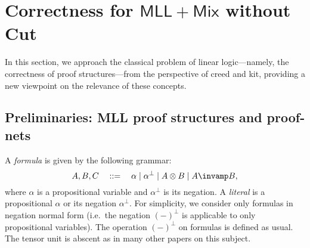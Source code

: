 \section{Correctness for $\mathsf{MLL+Mix}$ without Cut}
In this section, we approach the classical problem of linear logic---namely, the correctness of proof structures---from the perspective of creed and kit, providing a new viewpoint on the relevance of these concepts.


\subsection{Preliminaries: MLL proof structures and proof-nets}

\newcommand{\PropVar}{\alpha}
\newcommand{\PropVarb}{\beta}
\newcommand{\PropVarc}{\gamma}

A \emph{formula} is given by the following grammar:
\begin{equation*}
    A,B,C
    \quad::=\quad
    \PropVar \mid \PropVar^{\bot} \mid A \otimes B \mid A \llpar B,
\end{equation*}
where \( \PropVar \) is a propositional variable and \( \PropVar^{\bot} \) is its negation.
A \emph{literal} is a propositional \( \PropVar \) or its negation \( \PropVar^{\bot} \).
For simplicity, we consider only formulas in negation normal form (i.e.~the negation \( ({-})^{\bot} \) is applicable to only propositional variables).
The operation \( ({-})^{\bot} \) on formulas is defined as usual.
The tensor unit is abscent as in many other papers on this subject.

